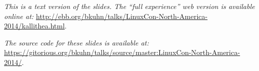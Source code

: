 \begin{center}
\textit{
This is a text version of the slides. The ``full experience'' web version is available
online at:} \url{http://ebb.org/bkuhn/talks/LinuxCon-North-America-2014/kallithea.html}.

\textit{The source code for these slides is available at:}
  \url{https://gitorious.org/bkuhn/talks/source/master:LinuxCon-North-America-2014/}.

\end{center}

